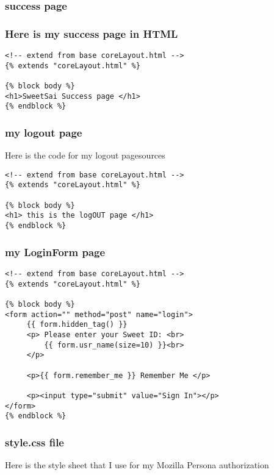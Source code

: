 \documentclass[11pt]{article}
\begin{document}
\subsubsection{success page}
\label{sec-7-4-6}
\subsubsection{Here is my success page in HTML}
\label{sec-7-4-7}


\begin{verbatim}
<!-- extend from base coreLayout.html -->
{% extends "coreLayout.html" %}

{% block body %}
<h1>SweetSai Success page </h1>
{% endblock %}
\end{verbatim}
\subsubsection{my logout page}
\label{sec-7-4-8}

Here is the code for my logout page\label{sources}sources 

\begin{verbatim}
<!-- extend from base coreLayout.html -->
{% extends "coreLayout.html" %}

{% block body %}
<h1> this is the logOUT page </h1>
{% endblock %}
\end{verbatim}
\subsubsection{my LoginForm page}
\label{sec-7-4-9}


\begin{verbatim}
<!-- extend from base coreLayout.html -->
{% extends "coreLayout.html" %}

{% block body %}
<form action="" method="post" name="login">
     {{ form.hidden_tag() }}
     <p> Please enter your Sweet ID: <br>
         {{ form.usr_name(size=10) }}<br>
     </p>

     <p>{{ form.remember_me }} Remember Me </p>

     <p><input type="submit" value="Sign In"></p>
</form>
{% endblock %}
\end{verbatim}
\subsubsection{style.css file}
\label{sec-7-4-10}

Here is the style sheet that I use for my Mozilla Persona authorization
\end{document}
